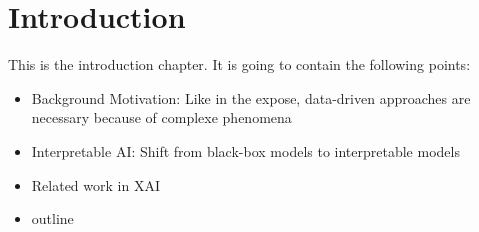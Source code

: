 





\chapter{Introduction}

This is the introduction chapter. It is going to contain the following points:

\begin{itemize}
	\item Background Motivation: Like in the expose, data-driven approaches are necessary because of complexe phenomena
	\item Interpretable AI: Shift from black-box models to interpretable models
	\item Related work in XAI
	\item outline
\end{itemize}
	
